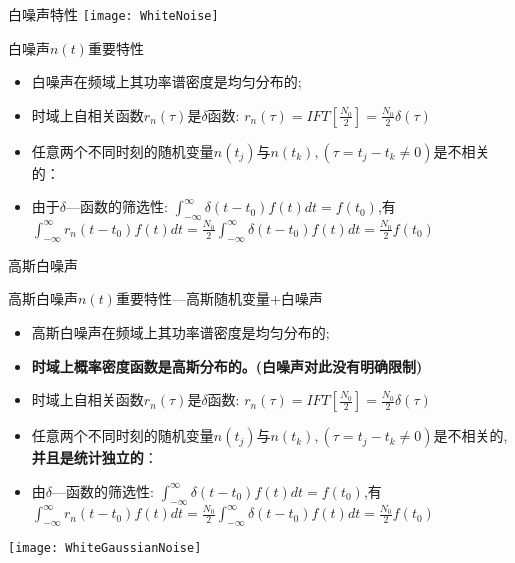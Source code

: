 \begin{frame}{白噪声特性}
\texttt{[image: WhiteNoise]}
\begin{block}{白噪声$n(t)$重要特性}
	\begin{itemize}
		\item 白噪声在频域上其功率谱密度是均匀分布的;
		\item 时域上自相关函数$r_n(\tau)$是$\delta$函数: $r_n(\tau)=IFT[\frac{N_0}{2}]=\frac{N_0}{2}\delta(\tau)$
		\item 任意两个不同时刻的随机变量$n(t_j)$与$n(t_k),(\tau=t_j-t_k\ne 0)$是不相关的：\\
		\item 由于$\delta$---函数的筛选性: $\int_{-\infty}^{\infty}\delta(t-t_0)f(t)dt=f(t_0)$,有\\
		$\int_{-\infty}^{\infty}r_n(t-t_0)f(t)dt=\frac{N_0}{2}\int_{-\infty}^{\infty}\delta(t-t_0)f(t)dt=\frac{N_0}{2}f(t_0)$
	\end{itemize}	
\end{block}
\end{frame}

\begin{frame}{高斯白噪声}
\begin{block}{高斯白噪声$n(t)$重要特性---高斯随机变量+白噪声}
	\begin{itemize}
		\item 高斯白噪声在频域上其功率谱密度是均匀分布的;
		\item \textbf{时域上概率密度函数是高斯分布的。(白噪声对此没有明确限制)}
		\item 时域上自相关函数$r_n(\tau)$是$\delta$函数: $r_n(\tau)=IFT[\frac{N_0}{2}]=\frac{N_0}{2}\delta(\tau)$
		\item 任意两个不同时刻的随机变量$n(t_j)$与$n(t_k),(\tau=t_j-t_k\ne 0)$是不相关的,\textbf{并且是统计独立的}：\\
		\item 由$\delta$---函数的筛选性: $\int_{-\infty}^{\infty}\delta(t-t_0)f(t)dt=f(t_0)$,有\\
		$\int_{-\infty}^{\infty}r_n(t-t_0)f(t)dt=\frac{N_0}{2}\int_{-\infty}^{\infty}\delta(t-t_0)f(t)dt=\frac{N_0}{2}f(t_0)$
	\end{itemize}	
\end{block}
\texttt{[image: WhiteGaussianNoise]}
\end{frame}

